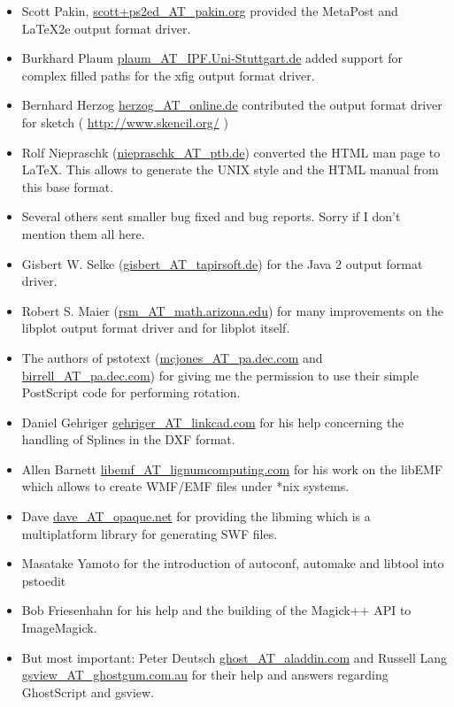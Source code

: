 \documentclass[english,a4paper]{article}
\let\URL\url \let\Email\url \let\File\url
\begin{document}
\begin{itemize}
  \item Scott Pakin,  \Email{scott+ps2ed_AT_pakin.org}   provided the MetaPost and LaTeX2e output format driver.
  
  \item Burkhard Plaum \Email{plaum_AT_IPF.Uni-Stuttgart.de} added support for
     complex filled paths for the xfig output format driver.

  \item Bernhard Herzog \Email{herzog_AT_online.de} contributed the output format driver for
     sketch ( \URL{http://www.skencil.org/} )

  \item Rolf Niepraschk (\Email{niepraschk_AT_ptb.de}) converted the HTML man page
     to LaTeX. This allows to generate the UNIX style and the HTML manual from this
     base format.

  \item Several others sent smaller bug fixed and bug reports. Sorry if I don't
     mention them all here.

  \item Gisbert W. Selke (\Email{gisbert_AT_tapirsoft.de}) for the Java 2 output format driver.
     
  \item Robert S. Maier (\Email{rsm_AT_math.arizona.edu}) for many improvements on
	the libplot output format driver and for libplot itself.
  \item The authors of pstotext (\Email{mcjones_AT_pa.dec.com} and \Email{birrell_AT_pa.dec.com}) 
	for giving me the permission to use their simple PostScript code for 
	performing rotation.
  \item  Daniel Gehriger \Email{gehriger_AT_linkcad.com} for his help concerning the handling of Splines in the DXF format. 
  \item Allen Barnett \Email{libemf_AT_lignumcomputing.com} for his work on the libEMF which allows to create WMF/EMF files under *nix systems.
  \item Dave \Email{dave_AT_opaque.net} for providing the libming which is a multiplatform library for generating SWF files.
  \item Masatake Yamoto for the introduction of autoconf, automake and libtool into pstoedit
  \item Bob Friesenhahn for his help and the building of the Magick++ API to ImageMagick.
  \item But most important: Peter Deutsch \Email{ghost_AT_aladdin.com} and Russell
     Lang \Email{gsview_AT_ghostgum.com.au} for their help and answers regarding
     GhostScript and gsview.

\end{itemize}
\end{document}
